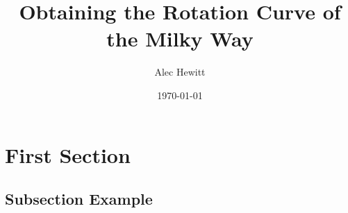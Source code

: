 \documentclass{beamer}
\title[Rotation Curves]{Obtaining the Rotation Curve of the Milky Way} %
\author{Alec Hewitt} %
\institute[University of Utah] %
{
University of Utah %
\medskip\\
\textit{With: Pearl Sandick (University of Utah), Fabio Iocco (ICTP-SAIFR)} %
}
\date{\today} %
\begin{document}
\begin{frame}
\titlepage %
\end{frame}



\section{First Section} %

\subsection{Subsection Example} %



\end{document}
